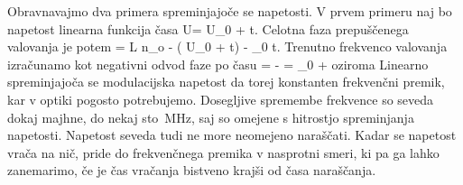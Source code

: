 Obravnavajmo dva primera spreminjajoče se napetosti. V prvem primeru naj bo 
napetost linearna funkcija časa 
\beq
U= U_0 + t.
\eeq
Celotna faza prepuščenega valovanja je potem
\beq
\phi = L n_o - \left( U_0 + 
t\right) - \omega_0 t.
\eeq
Trenutno frekvenco valovanja izračunamo kot negativni odvod faze po času
\beq
\omega = - = \omega_0 +  
\eeq
oziroma
Linearno spreminjajoča se modulacijska napetost da torej konstanten frekvenčni premik, kar v optiki 
pogosto potrebujemo. Dosegljive spremembe frekvence so seveda dokaj majhne,
do nekaj sto~MHz, saj so omejene s hitrostjo spreminjanja napetosti.
Napetost seveda tudi ne more neomejeno naraščati. Kadar se napetost
vrača na nič, pride do frekvenčnega premika v nasprotni smeri, ki pa ga
lahko zanemarimo, če je čas vračanja bistveno krajši od časa naraščanja.

